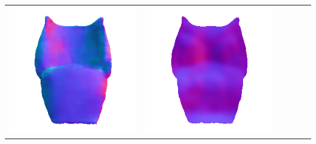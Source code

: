 \begin{center}
\begin{tabularx}{\linewidth}{@{}Y@{}Y@{}Y@{}Y@{}Y@{}Y@{}}
\includegraphics[width=\linewidth]{semisynthetic/20150514_15_marrnet_out.png} &
\includegraphics[width=\linewidth]{semisynthetic/20150514_15_ef_out.png} \\

\end{tabularx}
\end{center}
